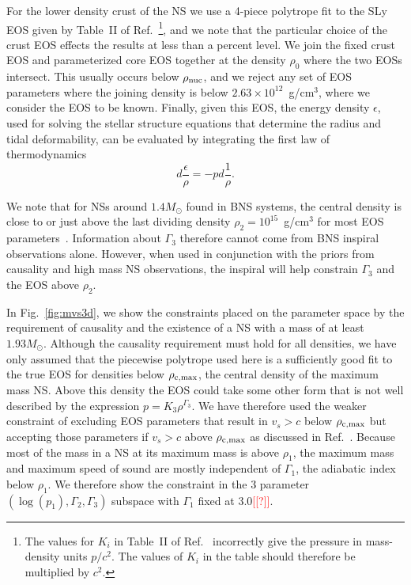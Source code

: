 \documentclass[twocolumn,prd,amssymb,aps,nofootinbib,showpacs,epsf]{revtex4}
\newcommand{\red}{\textcolor{red}}
\begin{document}
For the lower density crust of the NS we use a 4-piece polytrope fit to the SLy EOS given by Table~II of Ref.~\cite{ReadLackey2009}\footnote{The values for $K_i$ in Table~II of Ref.~\cite{ReadLackey2009} incorrectly give the pressure in mass-density units $p/c^2$. The values of $K_i$ in the table should therefore be multiplied by $c^2$.}, and we note that the particular choice of the crust EOS effects the results at less than a percent level. We join the fixed crust EOS and parameterized core EOS together at the density $\rho_0$ where the two EOSs intersect. This usually occurs below $\rho_{\rm nuc}$, and we reject any set of EOS parameters where the joining density is below $2.63\times 10^{12}$~g/cm$^3$, where we consider the EOS to be known. Finally, given this EOS, the energy density $\epsilon$, used for solving the stellar structure equations that determine the radius and tidal deformability, can be evaluated by integrating the first law of thermodynamics
\begin{equation}
d\frac{\epsilon}{\rho} = - p d\frac{1}{\rho}.
\end{equation}

We note that for NSs around $1.4M_\odot$ found in BNS systems, the central density is close to or just above the last dividing density $\rho_2 = 10^{15}$~g/cm$^3$ for most EOS parameters~\cite{ReadLackey2009}. Information about $\Gamma_3$ therefore cannot come from BNS inspiral observations alone. However, when used in conjunction with the priors from causality and high mass NS observations, the inspiral will help constrain $\Gamma_3$ and the EOS above $\rho_2$.

In Fig.~\ref{fig:mvs3d}, we show the constraints placed on the parameter space by the requirement of causality and the existence of a NS with a mass of at least $1.93M_\odot$. Although the causality requirement must hold for all densities, we have only assumed that the piecewise polytrope used here is a sufficiently good fit to the true EOS for densities below $\rho_{\rm c, max}$, the central density of the maximum mass NS. Above this density the EOS could take some other form that is not well described by the expression $p = K_3 \rho^{\Gamma_3}$. We have therefore used the weaker constraint of excluding EOS parameters that result in $v_s > c$ below $\rho_{\rm c, max}$ but accepting those parameters if $v_s > c$ above $\rho_{\rm c, max}$ as discussed in Ref.~\cite{ReadLackey2009}. Because most of the mass in a NS at its maximum mass is above $\rho_1$, the maximum mass and maximum speed of sound are mostly independent of $\Gamma_1$, the adiabatic index below $\rho_1$. We therefore show the constraint in the 3 parameter $(\log(p_1), \Gamma_2, \Gamma_3)$ subspace with $\Gamma_1$ fixed at 3.0\red{[[?]]}. 
\end{document}
